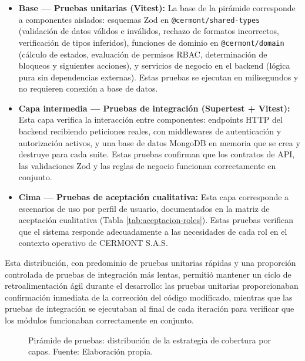 \begin{itemize}
    \item \textbf{Base — Pruebas unitarias (Vitest):} La base de la pirámide corresponde a componentes aislados: esquemas Zod en \texttt{@cermont/shared-types} (validación de datos válidos e inválidos, rechazo de formatos incorrectos, verificación de tipos inferidos), funciones de dominio en \texttt{@cermont/domain} (cálculo de estados, evaluación de permisos RBAC, determinación de bloqueos y siguientes acciones), y servicios de negocio en el backend (lógica pura sin dependencias externas). Estas pruebas se ejecutan en milisegundos y no requieren conexión a base de datos.
    
    \item \textbf{Capa intermedia — Pruebas de integración (Supertest + Vitest):} Esta capa verifica la interacción entre componentes: endpoints HTTP del backend recibiendo peticiones reales, con middlewares de autenticación y autorización activos, y una base de datos MongoDB en memoria que se crea y destruye para cada suite. Estas pruebas confirman que los contratos de API, las validaciones Zod y las reglas de negocio funcionan correctamente en conjunto.

    \item \textbf{Cima — Pruebas de aceptación cualitativa:} Esta capa corresponde a escenarios de uso por perfil de usuario, documentados en la matriz de aceptación cualitativa (Tabla \ref{tab:aceptacion-roles}). Estas pruebas verifican que el sistema responde adecuadamente a las necesidades de cada rol en el contexto operativo de CERMONT S.A.S.
\end{itemize}

Esta distribución, con predominio de pruebas unitarias rápidas y una proporción controlada de pruebas de integración más lentas, permitió mantener un ciclo de retroalimentación ágil durante el desarrollo: las pruebas unitarias proporcionaban confirmación inmediata de la corrección del código modificado, mientras que las pruebas de integración se ejecutaban al final de cada iteración para verificar que los módulos funcionaban correctamente en conjunto.

\begin{figure}[!htbp]
\centering
\resizebox{0.95\textwidth}{!}{%
%
}
\caption{Pirámide de pruebas: distribución de la estrategia de cobertura por capas. Fuente: Elaboración propia.}
\label{fig:piramide-pruebas-integrada}
\end{figure}

